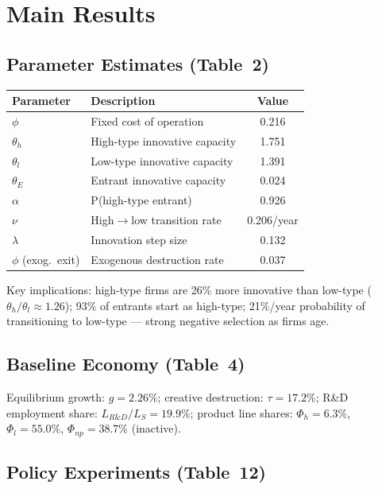 \section{Main Results}

\subsection*{Parameter Estimates (Table~2)}

\begin{center}
\small
\begin{tabular}{llc}
\toprule
\textbf{Parameter} & \textbf{Description} & \textbf{Value} \\
\midrule
$\phi$ & Fixed cost of operation & 0.216 \\
$\theta_h$ & High-type innovative capacity & 1.751 \\
$\theta_l$ & Low-type innovative capacity & 1.391 \\
$\theta_E$ & Entrant innovative capacity & 0.024 \\
$\alpha$ & P(high-type entrant) & 0.926 \\
$\nu$ & High$\to$low transition rate & 0.206/year \\
$\lambda$ & Innovation step size & 0.132 \\
$\phi$ (exog.\ exit) & Exogenous destruction rate & 0.037 \\
\bottomrule
\end{tabular}
\end{center}

Key implications: high-type firms are 26\% more innovative than low-type
($\theta_h/\theta_l\approx 1.26$); 93\% of entrants start as high-type; 21\%/year
probability of transitioning to low-type --- strong negative selection as firms age.

\subsection*{Baseline Economy (Table~4)}

Equilibrium growth: $g = 2.26\%$; creative destruction: $\tau = 17.2\%$;
R\&D employment share: $L_{R\&D}/L_S = 19.9\%$; product line shares:
$\Phi_h = 6.3\%$, $\Phi_l = 55.0\%$, $\Phi_{np} = 38.7\%$ (inactive).

\subsection*{Policy Experiments (Table~12)}

